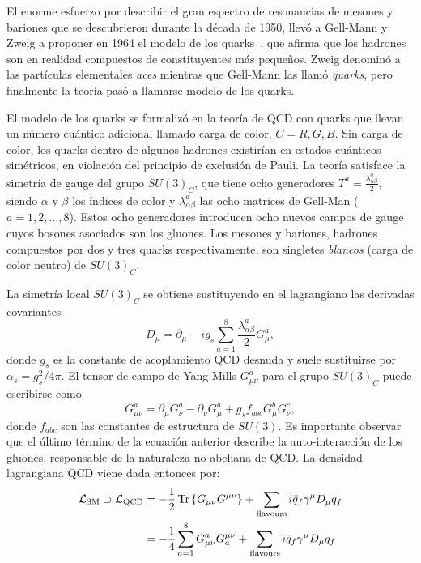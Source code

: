 El enorme esfuerzo por describir el gran espectro de resonancias de mesones y bariones que se descubrieron durante la década de 1950, llevó a Gell-Mann y Zweig a proponer en 1964 el modelo de los quarks~\cite{Gellmann-1964,Zweig-1964_1,Zweig-1964_2}, que afirma que los hadrones son en realidad compuestos de constituyentes más pequeños. Zweig denominó a las partículas elementales \textit{aces} mientras que Gell-Mann las llamó \textit{quarks}, pero finalmente la teoría pasó a llamarse modelo de los quarks.

El modelo de los quarks se formalizó en la teoría de \ac{QCD} con quarks que llevan un número cuántico adicional llamado carga de color, \(C=R,G,B\). Sin carga de color, los quarks dentro de algunos hadrones existirían en estados cuánticos simétricos, en violación del principio de exclusión de Pauli.
La teoría satisface la simetría de gauge del grupo \(SU(3)_C\), que tiene ocho generadores \(T^a = \frac{\lambda_{\alpha\beta}^a}{2}\), siendo \(\alpha\) y \(\beta\) los índices de color y \(\lambda_{\alpha\beta}^a\) las ocho matrices de Gell-Man (\(a=1,2,\dots,8\)). Estos ocho generadores introducen ocho nuevos campos de gauge cuyos bosones asociados son los gluones.
Los mesones y bariones, hadrones compuestos por dos y tres quarks respectivamente, son singletes \textit{blancos} (carga de color neutro) de \(SU(3)_C\).

La simetría local \(SU(3)_C\) se obtiene sustituyendo en el lagrangiano las derivadas covariantes
\begin{equation*}
    D_{\mu} = \partial_{\mu} - i g_s \sum_{a=1}^{8} \frac{\lambda_{\alpha\beta}^a}{2} G_{\mu}^a,
\end{equation*}
donde \(g_s\) es la constante de acoplamiento \ac{QCD} desnuda y suele sustituirse por \(\alpha_s = g_s^2 / 4\pi\). El tensor de campo de Yang-Mills \(G_{\mu\nu}^a\) para el grupo \(SU(3)_C\) puede escribirse como
\begin{equation*}
    G_{\mu\nu}^a = \partial_{\mu} G_{\nu}^a - \partial_{\nu} G_{\mu}^a + g_s f_{abc} G_{\mu}^b G_{\nu}^c,
\end{equation*}
donde \(f_{abc}\) son las constantes de estructura de \(SU(3)\). Es importante observar que el último término de la ecuación anterior describe la auto-interacción de los gluones, responsable de la naturaleza no abeliana de \ac{QCD}.
La densidad lagrangiana \ac{QCD} viene dada entonces por:
\begin{align*}
    \mathcal{L}_{\text{SM}} \supset \mathcal{L}_{\text{QCD}}
    &=
        -\frac{1}{2} \Tr\left\{G_{\mu\nu}G^{\mu\nu}\right\}
        + 
        \sum_{\text{flavours}} i \bar{q}_f \gamma^{\mu} D_{\mu} q_f\\
    &=
        -\frac{1}{4} \sum_{a=1}^{8} G_{\mu\nu}^a G^{\mu\nu}_a
        + 
        \sum_{\text{flavours}} i \bar{q}_f \gamma^{\mu} D_{\mu} q_f
\end{align*}

